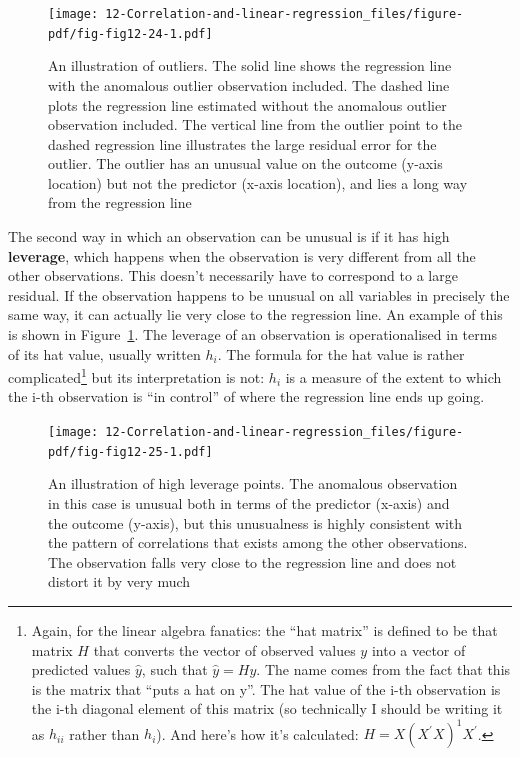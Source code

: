 \documentclass[
  a4paper,
]{book}
\begin{document}
\begin{figure}

\texttt{[image: 12-Correlation-and-linear-regression\_files/figure-pdf/fig-fig12-24-1.pdf]} \hfill{}

\caption{\label{fig-fig12-24}An illustration of outliers. The solid line
shows the regression line with the anomalous outlier observation
included. The dashed line plots the regression line estimated without
the anomalous outlier observation included. The vertical line from the
outlier point to the dashed regression line illustrates the large
residual error for the outlier. The outlier has an unusual value on the
outcome (y-axis location) but not the predictor (x-axis location), and
lies a long way from the regression line}

\end{figure}

The second way in which an observation can be unusual is if it has high
\textbf{leverage}, which happens when the observation is very different
from all the other observations. This doesn't necessarily have to
correspond to a large residual. If the observation happens to be unusual
on all variables in precisely the same way, it can actually lie very
close to the regression line. An example of this is shown in
Figure~\ref{fig-fig12-24}. The leverage of an observation is
operationalised in terms of its hat value, usually written \(h_i\). The
formula for the hat value is rather complicated\footnote{Again, for the
  linear algebra fanatics: the ``hat matrix'' is defined to be that
  matrix \(H\) that converts the vector of observed values \(y\) into a
  vector of predicted values \(\hat{y}\), such that \(\hat{y} = Hy\).
  The name comes from the fact that this is the matrix that ``puts a hat
  on y''. The hat value of the i-th observation is the i-th diagonal
  element of this matrix (so technically I should be writing it as
  \(h_{ii}\) rather than \(h_i\)). And here's how it's calculated:
  \(H = X(X^{'}X)^{1}X^{'}\).} but its interpretation is not: \(h_i\) is
a measure of the extent to which the i-th observation is ``in control''
of where the regression line ends up going.

\begin{figure}

\texttt{[image: 12-Correlation-and-linear-regression\_files/figure-pdf/fig-fig12-25-1.pdf]} \hfill{}

\caption{\label{fig-fig12-25}An illustration of high leverage points.
The anomalous observation in this case is unusual both in terms of the
predictor (x-axis) and the outcome (y-axis), but this unusualness is
highly consistent with the pattern of correlations that exists among the
other observations. The observation falls very close to the regression
line and does not distort it by very much}

\end{figure}
\end{document}
